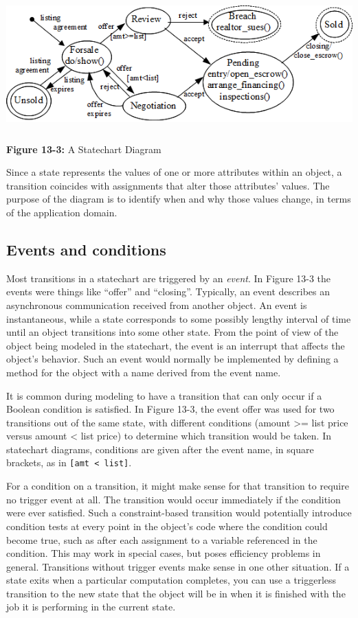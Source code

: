 \bigskip

\includegraphics[width=5.8in,height=2.0in]{ub-img/statechart.png}

{\sffamily\bfseries Figure 13-3:}
{\sffamily A Statechart Diagram}

\bigskip

Since a state represents the values of one or more attributes within an
object, a transition coincides with assignments that alter those
attributes' values. The purpose of the diagram is to
identify when and why those values change, in terms of the application
domain.

\subsection*{Events and conditions}

Most transitions in a statechart are triggered by an \textit{event}. In Figure 13-3 the events were things like
``offer'' and ``closing''.  Typically, an event describes an asynchronous
communication received from another object. An event is instantaneous, while a
state corresponds to some possibly lengthy interval of time until an object
transitions into some other state.  From the point of view of the object being
modeled in the statechart, the event is an interrupt that affects the object's
behavior. Such an event would normally be implemented by defining a method for
the object with a name derived from the event name.

It is common during modeling to have a transition that can only occur if a
Boolean condition is satisfied. In Figure 13-3, the event offer was used for
two transitions out of the same state, with different conditions (amount
{\textgreater}= list price versus amount {\textless} list price) to determine
which transition would be taken. In statechart diagrams, conditions are given
after the event name, in square brackets, as in
\texttt{[amt {\textless} list]}.

For a condition on a transition, it might make sense for that
transition to require no trigger event at all. The transition would
occur immediately if the condition were ever satisfied. Such a
constraint-based transition would potentially introduce condition tests
at every point in the object's code where the
condition could become true, such as after each assignment to a
variable referenced in the condition. This may work in special
cases, but poses efficiency problems in general. Transitions without
trigger events make sense in one other situation. If a state exits when
a particular computation completes, you can use a triggerless
transition to the new state that the object will be in when it is
finished with the job it is performing in the current state.

